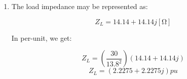 \begin{enumerate}
\begin{enumerate}
        In summary, we obtained the following in per-unit:

        $$\boxed{\left\{\begin{array}{l l l} I_m &= & .5227+.3241j\\I_G &= & .5227+.3241j\\I_L &= & .5227+.3241j\\V_G &= & .7284+.4047j\\V_L &= & .8052+.2807j\\S_G &= & .5119-.02454j\end{array}}$$

      \item 

        We may use the per-unit values obtained in (a) to easily convert back to real values:

        $$I=(.5227+.3241j)\left( \frac{30}{13.8} \right)$$
        $$\boxed{I=1.1363+0.7046j[\si{\kilo\ampere}]}$$

        $$V_G=(.7284+.4047j)(13.8)$$
        $$\boxed{V_G=10.0519+5.5849j[\si{\kilo\volt}]}$$

        $$V_L=(.8052+.2807j)(13.8)$$
        $$\boxed{V_L=11.1118+3.8737j[\si{\kilo\volt}]}$$

        $$S_G=(.5119-.02454j)(30)$$
        $$\boxed{S_G=15.357-.7362j[\si{\mega\volt\ampere}]}$$

        In summary, we obtained the following:

        $$\boxed{\left\{\begin{array}{l l l} I_m &= & 1.1363+.7046j [\si{\kilo\ampere}]\\I_G &= & 1.1363+.7046j [\si{\kilo\ampere}]\\I_L &= & 1.1363+.7046j [\si{\kilo\ampere}]\\V_G &= & 10.0519+5.5849j[\si{\kilo\volt}]\\V_L &= & 11.1118+3.8737j[\si{\kilo\volt}]\\S_G &= & 15.357-.7362j[\si{\mega\volt\ampere}]\end{array}}$$

    \end{enumerate}

  \item

    The load impedance may be represented as:

    $$Z_L=14.14+14.14j[\si{\ohm}]$$

    In per-unit, we get:

    $$Z_L=\left( \frac{30}{13.8^2} \right)(14.14+14.14j)$$
    $$Z_L=(2.2275+2.2275j)pu$$


\end{enumerate}

